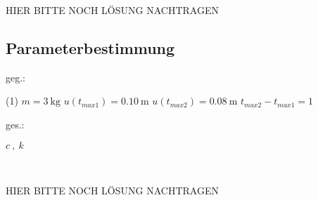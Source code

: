 \documentclass[12pt]{exam}
\begin{document}
\begin{questions}
        \begin{solution}
        HIER BITTE NOCH LÖSUNG NACHTRAGEN
        \end{solution}

 \newpage

 \subsection{Parameterbestimmung}


 


     \begin{minipage}[t]{.49\linewidth}
        geg.:
        \begin{tasks}(1)
           \task[] $m = \SI{3}{\kilo\gram}$
           \task[] $u(t_{max1}) = \SI{0.10}{\meter}$
           \task[] $u(t_{max2}) = \SI{0.08}{\meter}$
           \task[] $t_{max2}-t_{max1} = 1$
        \end{tasks}
        \end{minipage}
        \begin{minipage}[t]{.49\linewidth}
        ges.:
        \begin{tasks}
            \task $c ~,~ k$
        \end{tasks}
        \end{minipage}\\
        \vspace{1cm}

        \begin{solution}
        HIER BITTE NOCH LÖSUNG NACHTRAGEN\vfill
        \end{solution}






\end{questions}
\end{document}
